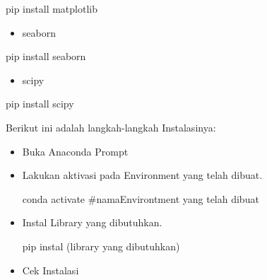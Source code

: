 \documentclass[
  letterpaper,
  DIV=11,
  numbers=noendperiod]{scrreprt}
\newenvironment{Shaded}{\begin{snugshade}}{\end{snugshade}}
\newcommand{\NormalTok}[1]{\textcolor[rgb]{0.00,0.23,0.31}{#1}}
\providecommand{\tightlist}{%
  \setlength{\itemsep}{0pt}\setlength{\parskip}{0pt}}\usepackage{longtable,booktabs,array}
\begin{document}
\begin{enumerate}
\begin{Shaded}
\begin{Highlighting}[]
\NormalTok{pip install matplotlib}
\end{Highlighting}
\end{Shaded}

  \begin{itemize}
  \tightlist
  \item
    seaborn\\
  \end{itemize}

\begin{Shaded}
\begin{Highlighting}[]
\NormalTok{pip install seaborn}
\end{Highlighting}
\end{Shaded}

  \begin{itemize}
  \tightlist
  \item
    scipy\\
  \end{itemize}

\begin{Shaded}
\begin{Highlighting}[]
\NormalTok{pip install scipy}
\end{Highlighting}
\end{Shaded}

  Berikut ini adalah langkah-langkah Instalasinya:

  \begin{itemize}
  \item
    Buka Anaconda Prompt
  \item
    Lakukan aktivasi pada Environment yang telah dibuat.

\begin{Shaded}
\begin{Highlighting}[]
\NormalTok{conda activate \#namaEnvirontment yang telah dibuat  }
\end{Highlighting}
\end{Shaded}
  \item
    Instal Library yang dibutuhkan.

\begin{Shaded}
\begin{Highlighting}[]
\NormalTok{pip instal (library yang dibutuhkan)}
\end{Highlighting}
\end{Shaded}
  \item
    Cek Instalasi


\end{itemize}
\end{enumerate}
\end{document}
